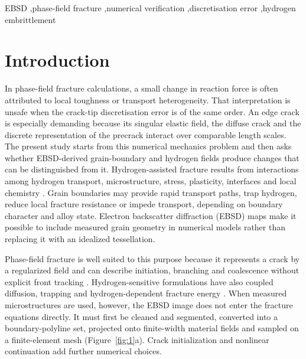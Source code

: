 \documentclass[preprint,12pt]{elsarticle}
\begin{document}
\begin{frontmatter}
\begin{keyword}
EBSD \sep phase-field fracture \sep numerical verification \sep discretisation error \sep hydrogen embrittlement
\end{keyword}

\end{frontmatter}

\section{Introduction}
In phase-field fracture calculations, a small change in reaction force is often
attributed to local toughness or transport heterogeneity. That interpretation is
unsafe when the crack-tip discretisation error is of the same order. An edge crack
is especially demanding because its singular elastic field, the diffuse crack and
the discrete representation of the precrack interact over comparable length
scales. The present study starts from this numerical mechanics problem and then
asks whether EBSD-derived grain-boundary and hydrogen fields produce changes that
can be distinguished from it.
Hydrogen-assisted fracture results from interactions among hydrogen transport,
microstructure, stress, plasticity, interfaces and local chemistry
\cite{oriani1970,sofronis1989,robertson2015,lynch2012,hirth1980,birnbaum1994,krom1999,dileo2013,serebrinsky2004,novak2010}.
Grain boundaries may provide rapid transport paths, trap hydrogen, reduce local
fracture resistance or impede transport, depending on boundary character and
alloy state. Electron backscatter diffraction (EBSD) maps make it possible to
include measured grain geometry in numerical models rather than replacing it
with an idealized tessellation.

Phase-field fracture is well suited to this purpose because it represents a crack
by a regularized field and can describe initiation, branching and coalescence
without explicit front tracking
\cite{griffith1921,francfort1998,bourdin2000,miehe2010,amor2009,bourdin2007,ambati2015,kristensen2021,bourdin2008,borden2012,karma2001,hakim2009,heister2015}.
Hydrogen-sensitive formulations have also coupled diffusion, trapping and
hydrogen-dependent fracture energy
\cite{martinezpaneda2018,golahmar2022,isfandbod2021}. When measured
microstructures are used, however, the EBSD image does not enter the fracture
equations directly. It must first be cleaned and segmented, converted into a
boundary-polyline set, projected onto finite-width material fields and sampled
on a finite-element mesh (Figure~\ref{fig:1}a). Crack initialization and nonlinear continuation add
further numerical choices.
\end{document}
